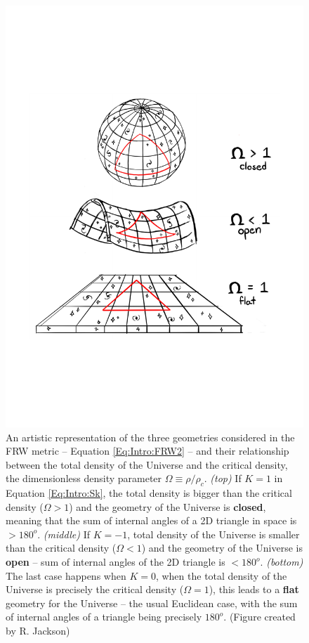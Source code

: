 \begin{figure}
\begin{center}
\includegraphics[scale=0.45]{Intro-FIGS/universeGeometry}
\caption[Artistic representation of the geometry of the Universe and its matter-energy content. Figure created by R. Jackson.]{An artistic representation of the three geometries considered in the FRW metric -- Equation \eqref{Eq:Intro:FRW2} -- and their relationship between the total density of the Universe and the critical density, the dimensionless density parameter $\Omega \equiv \rho/\rho_c$. \textit{(top)} If $K = 1$ in Equation \eqref{Eq:Intro:Sk}, the total density is bigger than the critical density ($\Omega > 1$) and the geometry of the Universe is \textbf{closed}, meaning that the sum of internal angles of a 2D triangle in space is $> 180^o$. \textit{(middle)} If $K = -1$, total density of the Universe is smaller than the critical density ($\Omega < 1$) and the geometry of the Universe is \textbf{open} -- sum of internal angles of the 2D triangle is $< 180^o$. \textit{(bottom)} The last case happens when $K = 0$, when the total density of the Universe is precisely the critical density ($\Omega = 1$), this leads to a \textbf{flat} geometry for the Universe -- the usual Euclidean case, with the sum of internal angles of a triangle being precisely $180^o$. (Figure created by R. Jackson)}
\label{fig:Intro:Geometry}
\end{center}
\end{figure}

